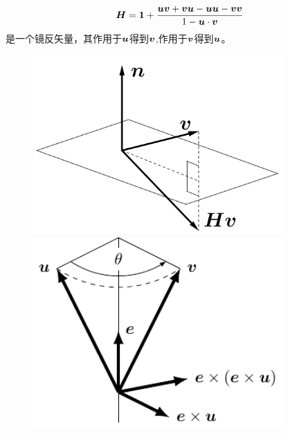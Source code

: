 \begin{exercise}
\begin{enumerate}
\begin{equation}
            \boldsymbol{H}=\boldsymbol{1}+\frac{\boldsymbol{uv}+\boldsymbol{vu}-\boldsymbol{uu}-\boldsymbol{vv}}{1-\boldsymbol{u}\cdot \boldsymbol{v}}
        \end{equation}
        是一个镜反矢量，其作用于$\boldsymbol{u}$得到$\boldsymbol{v}$,作用于$\boldsymbol{v}$得到$\boldsymbol{u}$。
    \end{enumerate}
    \begin{figure}[htbp]
        \centering
        \begin{minipage}[b]{0.48\textwidth}
            \centering
            \includegraphics[width=0.85\textwidth]{./image/2.4.pdf}
            \caption{}
            \label{fig:2.4}
        \end{minipage}
        \begin{minipage}[b]{0.48\textwidth}
            \centering
            \includegraphics[width=0.85\textwidth]{./image/2.5.pdf}
            \caption{}
            \label{fig:2.5}
        \end{minipage}

\end{figure}
\end{exercise}
